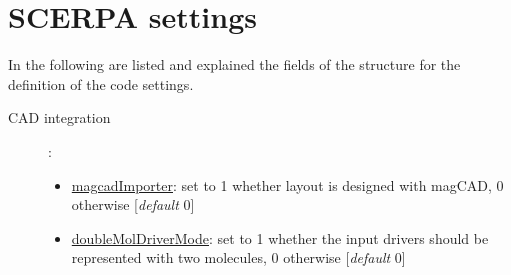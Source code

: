 \documentclass[a4paper,10pt]{article}
\begin{document}
\section{SCERPA settings}
\noindent In the following are listed and explained the fields of the structure for the definition of the code settings.

\begin{description}
\item[CAD integration]:
	\begin{itemize}
	\item \underline{magcadImporter}: set to 1 whether layout is designed with magCAD, 0 otherwise [\textit{default} 0]
	\item \underline{doubleMolDriverMode}: set to 1 whether the input drivers should be represented with two molecules, 0 otherwise [\textit{default} 0]
	\end{itemize}
		

\end{description}
\end{document}
